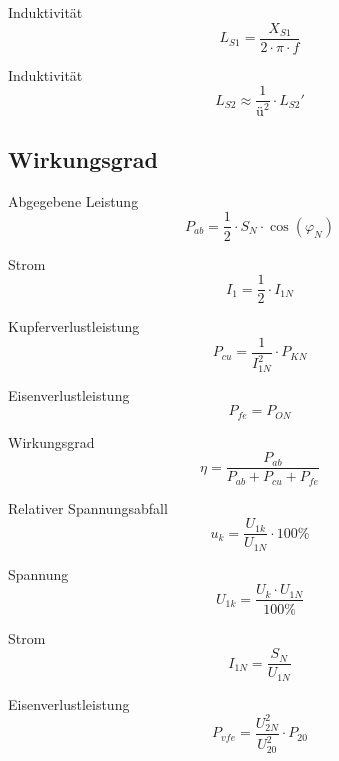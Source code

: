 \documentclass[11pt, a4paper, final, fleqn, twocolumn]{article}
\numberwithin{equation}{subsection}
\begin{document}
\noindent Induktivität
\begin{equation}
    L_{S1} = \frac{X_{S1}}{2 \cdot \pi \cdot f}
\end{equation}

\noindent Induktivität
\begin{equation}
    L_{S2} \approx \frac{1}{\text{ü}^2} \cdot L_{S2}'
\end{equation}


\subsection{Wirkungsgrad}

Abgegebene Leistung
\begin{equation}
    P_{ab} = \frac{1}{2} \cdot S_N \cdot \cos(\varphi_N)
\end{equation}

\noindent Strom
\begin{equation}
    I_1 = \frac{1}{2} \cdot I_{1N}
\end{equation}

\noindent Kupferverlustleistung
\begin{equation}
    P_{cu} = \frac{1}{I_{1N}^2} \cdot P_{KN}
\end{equation}

\noindent Eisenverlustleistung
\begin{equation}
    P_{fe} = P_{ON}
\end{equation}

\noindent Wirkungsgrad
\begin{equation}
    \eta = \frac{P_{ab}}{P_{ab} + P_{cu} + P_{fe}}
\end{equation}

\noindent Relativer Spannungsabfall
\begin{equation}
    u_k = \frac{U_{1k}}{U_{1N}} \cdot 100\%
\end{equation}

\noindent Spannung
\begin{equation}
    U_{1k} = \frac{U_k \cdot U_{1N}}{100\%}
\end{equation}

\noindent Strom
\begin{equation}
    I_{1N} = \frac{S_N}{U_{1N}}
\end{equation}

\noindent Eisenverlustleistung
\begin{equation}
    P_{vfe} = \frac{U_{2N}^2}{U_{20}^2} \cdot P_{20}
\end{equation}
\end{document}
